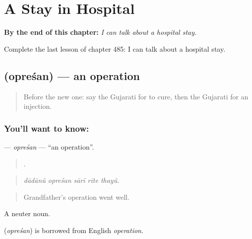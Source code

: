 
\chapter{A Stay in Hospital}
\label{ch:gu-a-stay-in-hospital}

\begin{chapteropening}
\textbf{By the end of this chapter:} \emph{I can talk about a hospital stay.}

Complete the last lesson of chapter 485: I can talk about a hospital stay.
\end{chapteropening}

\section[\texorpdfstring{\gu{ઓપરેશન} (opreśan)}{ઓપરેશન (opreśan)}]{ (opreśan) — an operation}

\label{lesson:GU-C485-opresan}



\begin{quote}
Before the new one: say the Gujarati for to cure, then the Gujarati for an injection.
\end{quote}

\subsection*{You'll want to know: }
\textbf{} — \emph{opreśan} — \textquotedblleft{}an operation\textquotedblright{}.

\begin{quote}
    .
\end{quote}

\begin{quote}
\emph{dādānũ opreśan sārī rīte thayũ.}
\end{quote}

\begin{quote}
Grandfather's operation went well.
\end{quote}

A neuter noun.

\begin{cousinweb}
\textbf{} (\emph{opreśan}) is borrowed from English \emph{operation}.
\end{cousinweb}

